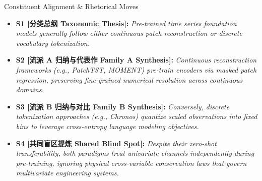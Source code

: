 \begin{TipBox}{Constituent Alignment \& Rhetorical Moves}
\begin{itemize}[leftmargin=1.5em]
  \item \textbf{S1 [分类总纲 Taxonomic Thesis]:} \textit{Pre-trained time series foundation models generally follow either continuous patch reconstruction or discrete vocabulary tokenization.}\par{}
  \item \textbf{S2 [流派 A 归纳与代表作 Family A Synthesis]:} \textit{Continuous reconstruction frameworks (e.g., PatchTST, MOMENT) pre-train encoders via masked patch regression, preserving fine-grained numerical resolution across continuous domains.}\par{}
  \item \textbf{S3 [流派 B 归纳与对比 Family B Synthesis]:} \textit{Conversely, discrete tokenization approaches (e.g., Chronos) quantize scaled observations into fixed bins to leverage cross-entropy language modeling objectives.}\par{}
  \item \textbf{S4 [共同盲区提炼 Shared Blind Spot]:} \textit{Despite their zero-shot transferability, both paradigms treat univariate channels independently during pre-training, ignoring physical cross-variable conservation laws that govern multivariate engineering systems.}\par{}
\end{itemize}
\end{TipBox}
\bigskip
